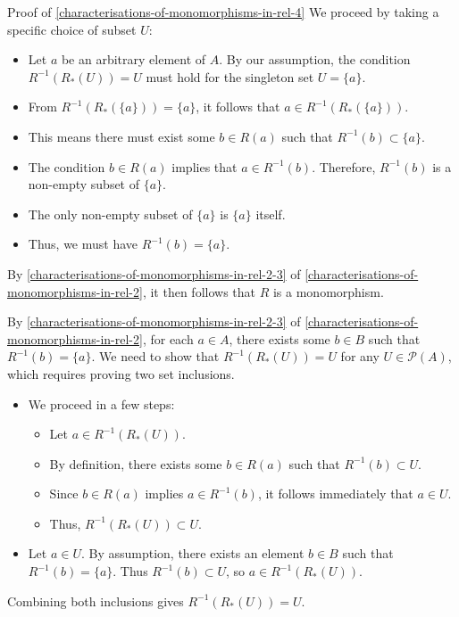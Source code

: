 \begin{Proof}{Proof of \cref{characterisations-of-monomorphisms-in-rel-4}}%
    We proceed by taking a specific choice of subset $U$:
    \begin{itemize}
        \item Let $a$ be an arbitrary element of $A$. By our assumption, the condition $R^{-1}(R_{*}(U))=U$ must hold for the singleton set $U=\{a\}$.
        \item From $R^{-1}(R_{*}(\{a\}))=\{a\}$, it follows that $a\in R^{-1}(R_{*}(\{a\}))$.
        \item This means there must exist some $b\in R(a)$ such that $R^{-1}(b)\subset\{a\}$.
        \item The condition $b\in R(a)$ implies that $a\in R^{-1}(b)$. Therefore, $R^{-1}(b)$ is a non-empty subset of $\{a\}$.
        \item The only non-empty subset of $\{a\}$ is $\{a\}$ itself.
        \item Thus, we must have $R^{-1}(b)=\{a\}$.
    \end{itemize}
    By \cref{characterisations-of-monomorphisms-in-rel-2-3} of \cref{characterisations-of-monomorphisms-in-rel-2}, it then follows that $R$ is a monomorphism.

    By \cref{characterisations-of-monomorphisms-in-rel-2-3} of \cref{characterisations-of-monomorphisms-in-rel-2}, for each $a\in A$, there exists some $b\in B$ such that $R^{-1}(b)=\{a\}$. We need to show that $R^{-1}(R_{*}(U))=U$ for any $U\in\mathcal{P}(A)$, which requires proving two set inclusions.
    \begin{itemize}
        \item{}We proceed in a few steps:
            \begin{itemize}
                \item Let $a\in R^{-1}(R_{*}(U))$.
                \item By definition, there exists some $b\in R(a)$ such that $R^{-1}(b)\subset U$.
                \item Since $b\in R(a)$ implies $a\in R^{-1}(b)$, it follows immediately that $a\in U$.
                \item Thus, $R^{-1}(R_{*}(U))\subset U$.
            \end{itemize}
        \item{}Let $a\in U$. By assumption, there exists an element $b\in B$ such that $R^{-1}(b)=\{a\}$. Thus $R^{-1}(b)\subset U$, so $a\in R^{-1}(R_{*}(U))$.
    \end{itemize}
    Combining both inclusions gives $R^{-1}(R_{*}(U))=U$.
\end{Proof}
